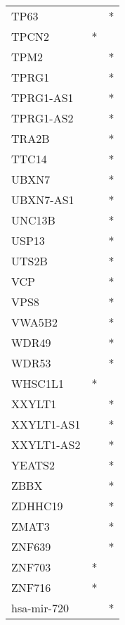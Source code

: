 \begin{longtable}{lcc}
TP63             &                &          * \\
TPCN2            &              * &            \\
TPM2             &                &          * \\
TPRG1            &                &          * \\
TPRG1-AS1        &                &          * \\
TPRG1-AS2        &                &          * \\
TRA2B            &                &          * \\
TTC14            &                &          * \\
UBXN7            &                &          * \\
UBXN7-AS1        &                &          * \\
UNC13B           &                &          * \\
USP13            &                &          * \\
UTS2B            &                &          * \\
VCP              &                &          * \\
VPS8             &                &          * \\
VWA5B2           &                &          * \\
WDR49            &                &          * \\
WDR53            &                &          * \\
WHSC1L1          &              * &            \\
XXYLT1           &                &          * \\
XXYLT1-AS1       &                &          * \\
XXYLT1-AS2       &                &          * \\
YEATS2           &                &          * \\
ZBBX             &                &          * \\
ZDHHC19          &                &          * \\
ZMAT3            &                &          * \\
ZNF639           &                &          * \\
ZNF703           &              * &            \\
ZNF716           &              * &            \\
hsa-mir-720      &                &          * \\
\end{longtable}
